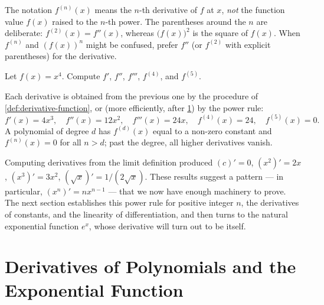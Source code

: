 \begin{caution}
The notation \(f^{(n)}(x)\) means the \(n\)-th derivative of \(f\) at \(x\), \emph{not} the function value \(f(x)\) raised to the \(n\)-th power. The parentheses around the \(n\) are deliberate: \(f^{(2)}(x) = f''(x)\), whereas \(\bigl(f(x)\bigr)^{2}\) is the square of \(f(x)\). When \(f^{(n)}\) and \((f(x))^{n}\) might be confused, prefer \(f''\) (or \(f^{(2)}\) with explicit parentheses) for the derivative.
\end{caution}

\begin{workedexample}
\begin{example}\label{ex:higher-derivative-quartic}
Let \(f(x) = x^{4}\). Compute \(f'\), \(f''\), \(f'''\), \(f^{(4)}\), and \(f^{(5)}\).
\end{example}

\begin{solution}
Each derivative is obtained from the previous one by the procedure of \cref{def:derivative-function}, or (more efficiently, after \cref{sec:polynomial-exponential-derivatives}) by the power rule:
\[
f'(x) = 4x^{3}, \quad f''(x) = 12 x^{2}, \quad f'''(x) = 24 x, \quad f^{(4)}(x) = 24, \quad f^{(5)}(x) = 0.
\]
A polynomial of degree \(d\) has \(f^{(d)}(x)\) equal to a non-zero constant and \(f^{(n)}(x) = 0\) for all \(n > d\); past the degree, all higher derivatives vanish.
\end{solution}
\end{workedexample}

Computing derivatives from the limit definition produced \((c)' = 0\), \((x^{2})' = 2x\), \((x^{3})' = 3x^{2}\), \((\sqrt{x})' = 1/(2\sqrt{x})\). These results suggest a pattern --- in particular, \((x^{n})' = n x^{n - 1}\) --- that we now have enough machinery to prove. The next section establishes this power rule for positive integer \(n\), the derivatives of constants, and the linearity of differentiation, and then turns to the natural exponential function \(e^{x}\), whose derivative will turn out to be itself.

\section{Derivatives of Polynomials and the Exponential Function}\label{sec:polynomial-exponential-derivatives}

